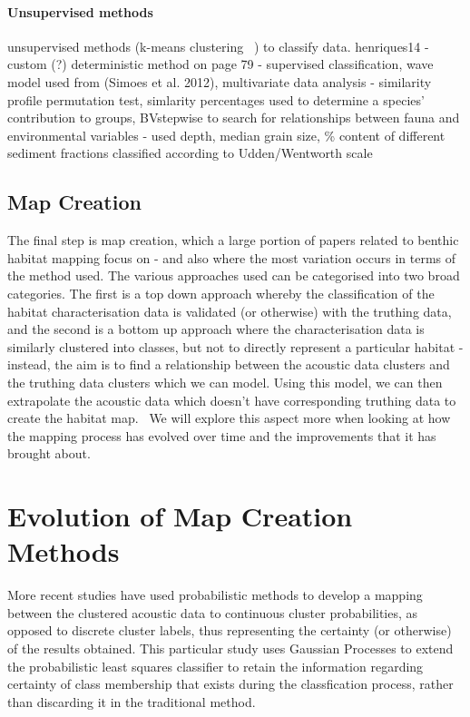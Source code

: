 \documentclass[12pt]{article}
\begin{document}
\begin{multicols}{2}
            \paragraph{Unsupervised methods}
            unsupervised methods (k-means clustering ~\citep{henriques14}) to classify data.
            henriques14 - custom (?) deterministic method on page 79 - supervised classification, wave model used from (Simoes et al. 2012), multivariate data analysis - similarity profile permutation test, simlarity percentages used to determine a species' contribution to groups, BVstepwise to search for relationships between fauna and environmental variables - used depth, median grain size, \% content of different sediment fractions classified according to Udden/Wentworth scale~\citep{henriques14}

            \subsection{Map Creation}
            The final step is map creation, which a large portion of papers related to benthic habitat mapping focus on - and also where the most variation occurs in terms of the method used. The various approaches used can be categorised into two broad categories. The first is a top down approach whereby the classification of the habitat characterisation data is validated (or otherwise) with the truthing data, and the second is a bottom up approach where the characterisation data is similarly clustered into classes, but not to directly represent a particular habitat - instead, the aim is to find a relationship between the acoustic data clusters and the truthing data clusters which we can model. Using this model, we can then extrapolate the acoustic data which doesn't have corresponding truthing data to create the habitat map.~\citep{ahsan11} We will explore this aspect more when looking at how the mapping process has evolved over time and the improvements that it has brought about.

            \section{Evolution of Map Creation Methods}

            More recent studies have used probabilistic methods to develop a mapping between the clustered acoustic data to continuous cluster probabilities, as opposed to discrete cluster labels, thus representing the certainty (or otherwise) of the results obtained. This particular study uses Gaussian Processes to extend the probabilistic least squares classifier to retain the information regarding certainty of class membership that exists during the classfication process, rather than discarding it in the traditional method.~\citep{bender12}


\end{multicols}
\end{document}
